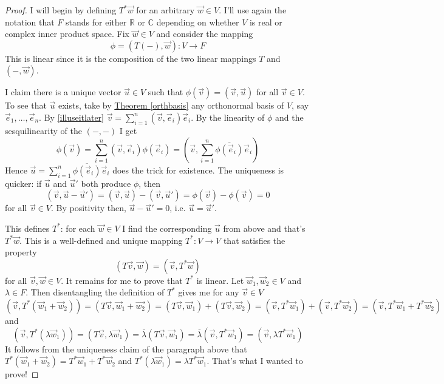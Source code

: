 \documentclass[11pt]{amsbook}
\theoremstyle{definition}
\begin{document}
\begin{proof}
I will begin by defining $T^{\ast}\vec{w}$ for an arbitrary $\vec{w}\in V$. I'll use again the notation that $F$ stands for either $\mathbb{R}$ or $\mathbb{C}$ depending on whether $V$ is real or complex inner product space. Fix $\vec{w}\in V$ and consider the mapping $$\phi = (T(-), \vec{w}): V\to F$$ This is linear since it is the composition of the two linear mappings $T$ and $(-, \vec{w})$.

I claim there is a unique vector $\vec{u}\in V$ such that $\phi(\vec{v}) = (\vec{v}, \vec{u})$ for all $\vec{v}\in V$. To see that $\vec{u}$ exists, take by \hyperref[orthbasis]{Theorem \ref{orthbasis}} any orthonormal basis of $V$, say $\vec{e}_1, \ldots , \vec{e}_n$. By \eqref{illuseitlater} $\vec{v} = \sum_{i=1}^n (\vec{v}, \vec{e}_i) \vec{e}_i$. By the linearity of $\phi$ and the sesquilinearity of the $(-,-)$ I get $$\phi(\vec{v}) = \sum_{i=1}^n (\vec{v}, \vec{e}_i) \phi(\vec{e}_i) = (\vec{v}, \sum_{i=1}^n \overline{\phi(\vec{e}_i)} \vec{e}_i)$$ Hence $\vec{u} =  \sum_{i=1}^n \overline{\phi(\vec{e}_i)} \vec{e}_i$ does the trick for existence. The uniqueness is quicker: if $\vec{u}$ and $\vec{u}'$ both produce $\phi$, then $$(\vec{v}, \vec{u} - \vec{u}') =  (\vec{v}, \vec{u}) - (\vec{v},  \vec{u}') = \phi(\vec{v}) - \phi(\vec{v}) = 0$$ for all $\vec{v} \in V$. By positivity then, $\vec{u}-\vec{u}' = 0$, i.e. $\vec{u} = \vec{u}'$.

This defines $T^{\ast}$: for each $\vec{w}\in V$ I find the corresponding $\vec{u}$ from above and that's $T^{\ast} \vec{w}$. This is a well-defined and unique mapping $T^{\ast} : V\to V$ that satisfies the property $$( T\vec{v}, \vec{w}) = (\vec{v}, T^{\ast}\vec{w})$$ for all $\vec{v}, \vec{w}\in V$. It remains for me to prove that $T^{\ast}$ is linear. Let $\vec{w}_1, \vec{w}_2 \in V$ and $\lambda \in F$. Then disentangling the definition of $T^{\ast}$ gives me for any $\vec{v}\in V$
$$
(\vec{v}, T^{\ast}(\vec{w}_1 + \vec{w}_2)) = (T\vec{v}, \vec{w}_1 + \vec{w_2}) = (T\vec{v}, \vec{w}_1) + (T\vec{v}, \vec{w}_2) = (\vec{v}, T^{\ast}\vec{w}_1) + (\vec{v}, T^{\ast}\vec{w}_2) = (\vec{v}, T^{\ast}\vec{w}_1 + T^{\ast}\vec{w}_2)$$
and
$$(\vec{v}, T^{\ast}(\lambda \vec{w}_1)) = (T\vec{v}, \lambda \vec{w}_1) = \overline{\lambda}(T\vec{v}, \vec{w}_1) = \overline{\lambda}(\vec{v}, T^{\ast}\vec{w}_1) = (\vec{v}, \lambda T^{\ast}\vec{w}_1)$$
It follows from the uniqueness claim of the paragraph above that $T^{\ast}(\vec{w}_1 + \vec{w}_2) = T^{\ast}\vec{w}_1 + T^{\ast}\vec{w}_2$ and $T^{\ast}(\lambda \vec{w}_1) = \lambda T^{\ast}\vec{w}_1$. That's what I wanted to prove!
\end{proof}
\end{document}
